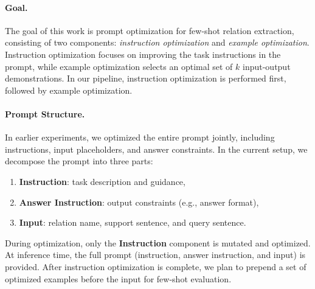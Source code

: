 \documentclass[12pt]{article}
\begin{document}
\paragraph{Goal.}
The goal of this work is prompt optimization for few-shot relation extraction, consisting of two components: \textit{instruction optimization} and \textit{example optimization}. Instruction optimization focuses on improving the task instructions in the prompt, while example optimization selects an optimal set of $k$ input-output demonstrations. In our pipeline, instruction optimization is performed first, followed by example optimization.

\paragraph{Prompt Structure.}
In earlier experiments, we optimized the entire prompt jointly, including instructions, input placeholders, and answer constraints. In the current setup, we decompose the prompt into three parts:
\begin{enumerate}
    \item \textbf{Instruction}: task description and guidance,
    \item \textbf{Answer Instruction}: output constraints (e.g., answer format),
    \item \textbf{Input}: relation name, support sentence, and query sentence.
\end{enumerate}

During optimization, only the \textbf{Instruction} component is mutated and optimized. At inference time, the full prompt (instruction, answer instruction, and input) is provided. After instruction optimization is complete, we plan to prepend a set of optimized examples before the input for few-shot evaluation.
\end{document}
